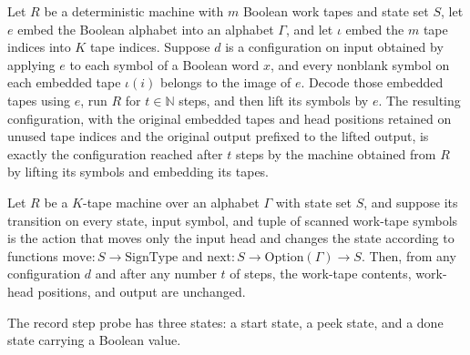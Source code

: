 \begin{theorem}
\label{Turing.recordStep_transport}
\leanok
{}
Let $R$ be a deterministic machine with $m$ Boolean work tapes and state set $S$, let
$e$ embed the Boolean alphabet into an alphabet $\Gamma$, and let $\iota$ embed the $m$
tape indices into $K$ tape indices. Suppose $d$ is a configuration on input obtained by
applying $e$ to each symbol of a Boolean word $x$, and every nonblank symbol on each
embedded tape $\iota(i)$ belongs to the image of $e$. Decode those embedded tapes using
$e$, run $R$ for $t\in\mathbb{N}$ steps, and then lift its symbols by $e$. The resulting
configuration, with the original embedded tapes and head positions retained on unused
tape indices and the original output prefixed to the lifted output, is exactly the
configuration reached after $t$ steps by the machine obtained from $R$ by lifting its
symbols and embedding its tapes.
\end{theorem}

\begin{theorem}
\label{Turing.recordStep_native_frame}
\leanok
{}
Let $R$ be a $K$-tape machine over an alphabet $\Gamma$ with state set $S$, and suppose
its transition on every state, input symbol, and tuple of scanned work-tape symbols is
the action that moves only the input head and changes the state according to functions
$\mathrm{move}:S\to\mathrm{SignType}$ and $\mathrm{next}:S\to\mathrm{Option}(\Gamma)\to
S$. Then, from any configuration $d$ and after any number $t$ of steps, the work-tape
contents, work-head positions, and output are unchanged.
\end{theorem}

\begin{definition}
\label{Turing.RecordStepProbe}
\leanok
The record step probe has three states: a start state, a peek state, and a done state
carrying a Boolean value.
\end{definition}

